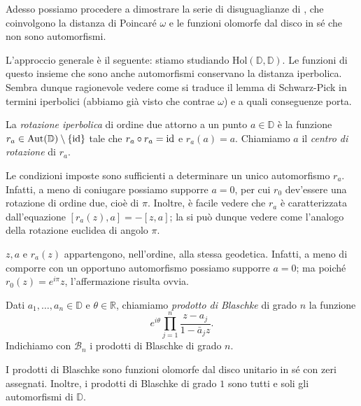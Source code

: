 Adesso possiamo procedere a dimostrare la serie di disuguaglianze di \cite{BM}, che coinvolgono la distanza di Poincaré $\omega$ e le funzioni olomorfe dal disco in sé che non sono automorfismi.

L'approccio generale è il seguente: stiamo studiando $\text{Hol}(\mathbb{D},\mathbb{D})$. Le funzioni di questo insieme che sono anche automorfismi conservano la distanza iperbolica. Sembra dunque ragionevole vedere come si traduce il lemma di Schwarz-Pick in termini iperbolici (abbiamo già visto che contrae $\omega$) e a quali conseguenze porta.

\begin{defn}
  La \textit{rotazione iperbolica} di ordine due attorno a un punto $a \in \mathbb{D}$ è la funzione $r_a \in \text{Aut}(\mathbb{D})\setminus\{\operatorname{id}\}$ tale che $r_a \circ r_a=\operatorname{id}$ e $r_a(a)=a$.
  Chiamiamo $a$ il \textit{centro di rotazione} di $r_a$.
\end{defn}

\begin{oss}
  Le condizioni imposte sono sufficienti a determinare un unico automorfismo $r_a$. Infatti, a meno di coniugare possiamo supporre $a=0$, per cui $r_0$ dev'essere una rotazione di ordine due, cioè di $\pi$. Inoltre, è facile vedere che $r_a$ è caratterizzata dall'equazione $[r_a(z),a]=-[z,a]$; la si può dunque vedere come l'analogo della rotazione euclidea di angolo $\pi$.
\end{oss}

\begin{oss} \label{rotegeo}
  $z, a$ e $r_a(z)$ appartengono, nell'ordine, alla stessa geodetica. Infatti, a meno di comporre con un opportuno automorfismo possiamo supporre $a=0$; ma poiché $r_0(z)=e^{i\pi}z$, l'affermazione risulta ovvia.
\end{oss}

\begin{defn}
  Dati $a_1,\dots,a_n \in \mathbb{D}$ e $\theta \in \mathbb{R}$, chiamiamo \textit{prodotto di Blaschke} di grado $n$ la funzione
  $$e^{i\theta}\prod_{j=1}^n \frac{z-a_j}{1-\bar{a}_jz}.$$
  Indichiamo con $\mathcal{B}_n$ i prodotti di Blaschke di grado $n$.
\end{defn}

\begin{oss}
  I prodotti di Blaschke sono funzioni olomorfe dal disco unitario in sé con zeri assegnati. Inoltre, i prodotti di Blaschke di grado $1$ sono tutti e soli gli automorfismi di $\mathbb{D}$.
\end{oss}

